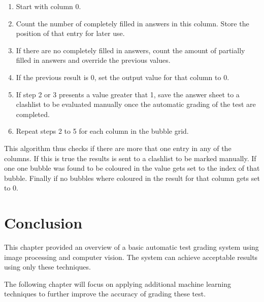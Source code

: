 \begin{enumerate}
\item Start with column 0.
\item Count the number of completely filled in answers in this column. Store the position of that entry for later use.
\item If there are no completely filled in answers, count the amount of partially filled in answers and override the previous values.
\item If the previous result is 0, set the output value for that column to 0.
\item If step 2 or 3 presents a value greater that 1, save the answer sheet to a clashlist to be evaluated manually once the automatic grading of the test are completed.
\item Repeat steps 2 to 5 for each column in the bubble grid.
\end{enumerate}

This algorithm thus checks if there are more that one entry in any of the columns. If this is true the results is sent to a clashlist to be marked manually. If one one bubble was found to be coloured in the value gets set to the index of that bubble. Finally if no bubbles where coloured in the result for that column gets set to 0.

\section{Conclusion}

This chapter provided an overview of a basic automatic test grading system using image processing and computer vision. The system can achieve acceptable results using only these techniques.

The following chapter will focus on applying additional machine learning techniques to further improve the accuracy of grading these test.